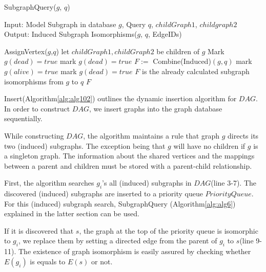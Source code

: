 \begin{algorithm}
\caption{SubgraphQuery($g$, $q$)}
\label{alg:alg106}
\begin{algorithmic}
\STATE Input: Model Subgraph in database  $g$, Query $q$, $childGraph1$, $childgraph2$
\STATE Output: Induced Subgraph Isomorphisms($g$, $q$, EdgeIDs)
\end{algorithmic}
\begin{algorithmic}[1]
        \STATE AssignVertex($g$,$q$)
      \ELSE 
         \STATE let $childGraph1,childGraph2$ be children of $g$
          \STATE Mark $g(dead)=true$
			\STATE mark $g(dead)=true$
		\ELSE
			\STATE $F :=$ Combine(Induced)$(g,q)$
		\ENDIF
	\ENDIF
		\STATE mark $g(alive)=true$
	\ELSE
		\STATE mark  $g(dead)=true$
	\ENDIF
\ELSE
	\STATE $F$ is the already calculated subgraph isomorphisms from $g$ to $q$
\ENDIF
\RETURN $F$
          
\end{algorithmic}
\end{algorithm}


Insert(Algorithm\ref{alg:alg102}) outlines the dynamic insertion algorithm for $DAG$. In order to construct $DAG$, we insert graphs into the graph database 
sequentially.

While constructing $DAG$, the algorithm maintains a rule that graph $g$ directs its two (induced) subgraphs.
The exception being that $g$ will have no children if $g$ is a singleton graph.
The information about the shared vertices and the mappings between a parent and children must be stored with a parent-child relationship.

First, the algorithm searches $g_i$'s all (induced) subgraphs in $DAG$(line 3-7).
The discovered (induced) subgraphs are inserted to a priority queue $PriorityQueue$.
For this (induced) subgraph search, SubgraphQuery (Algorithm\ref{alg:alg6}) explained in the latter section can be used.

If it is discovered that  $s$, the graph at the top of the priority queue is isomorphic to $g_i$,
we replace them by setting a directed edge from the parent of $g_i$ to $s$(line 9-11).
The existence of graph isomorphism is easily assured by checking whether $E(g_i)$ is equals to $E(s)$ or not.

